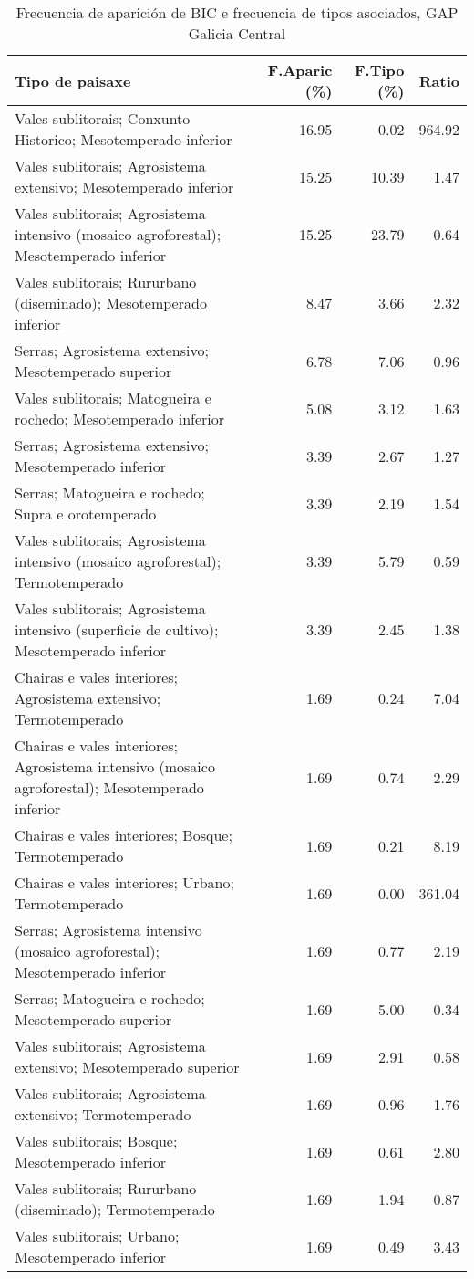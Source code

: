 \begin{table}[p]
\centering
\caption{Frecuencia de aparición de BIC e frecuencia de tipos asociados, GAP Galicia Central} 
\label{vbic7}
\begin{tabular}{lrrr}
  \hline
Tipo de paisaxe & F.Aparic (\%) & F.Tipo (\%) & Ratio \\ 
  \hline
Vales sublitorais; Conxunto Historico; Mesotemperado inferior & 16.95 & 0.02 & 964.92 \\ 
  Vales sublitorais; Agrosistema extensivo; Mesotemperado inferior & 15.25 & 10.39 & 1.47 \\ 
  Vales sublitorais; Agrosistema intensivo (mosaico agroforestal); Mesotemperado inferior & 15.25 & 23.79 & 0.64 \\ 
  Vales sublitorais; Rururbano (diseminado); Mesotemperado inferior & 8.47 & 3.66 & 2.32 \\ 
  Serras; Agrosistema extensivo; Mesotemperado superior & 6.78 & 7.06 & 0.96 \\ 
  Vales sublitorais; Matogueira e rochedo; Mesotemperado inferior & 5.08 & 3.12 & 1.63 \\ 
  Serras; Agrosistema extensivo; Mesotemperado inferior & 3.39 & 2.67 & 1.27 \\ 
  Serras; Matogueira e rochedo; Supra e orotemperado & 3.39 & 2.19 & 1.54 \\ 
  Vales sublitorais; Agrosistema intensivo (mosaico agroforestal); Termotemperado & 3.39 & 5.79 & 0.59 \\ 
  Vales sublitorais; Agrosistema intensivo (superficie de cultivo); Mesotemperado inferior & 3.39 & 2.45 & 1.38 \\ 
  Chairas e vales interiores; Agrosistema extensivo; Termotemperado & 1.69 & 0.24 & 7.04 \\ 
  Chairas e vales interiores; Agrosistema intensivo (mosaico agroforestal); Mesotemperado inferior & 1.69 & 0.74 & 2.29 \\ 
  Chairas e vales interiores; Bosque; Termotemperado & 1.69 & 0.21 & 8.19 \\ 
  Chairas e vales interiores; Urbano; Termotemperado & 1.69 & 0.00 & 361.04 \\ 
  Serras; Agrosistema intensivo (mosaico agroforestal); Mesotemperado inferior & 1.69 & 0.77 & 2.19 \\ 
  Serras; Matogueira e rochedo; Mesotemperado superior & 1.69 & 5.00 & 0.34 \\ 
  Vales sublitorais; Agrosistema extensivo; Mesotemperado superior & 1.69 & 2.91 & 0.58 \\ 
  Vales sublitorais; Agrosistema extensivo; Termotemperado & 1.69 & 0.96 & 1.76 \\ 
  Vales sublitorais; Bosque; Mesotemperado inferior & 1.69 & 0.61 & 2.80 \\ 
  Vales sublitorais; Rururbano (diseminado); Termotemperado & 1.69 & 1.94 & 0.87 \\ 
  Vales sublitorais; Urbano; Mesotemperado inferior & 1.69 & 0.49 & 3.43 \\ 
   \hline
\end{tabular}
\end{table}
